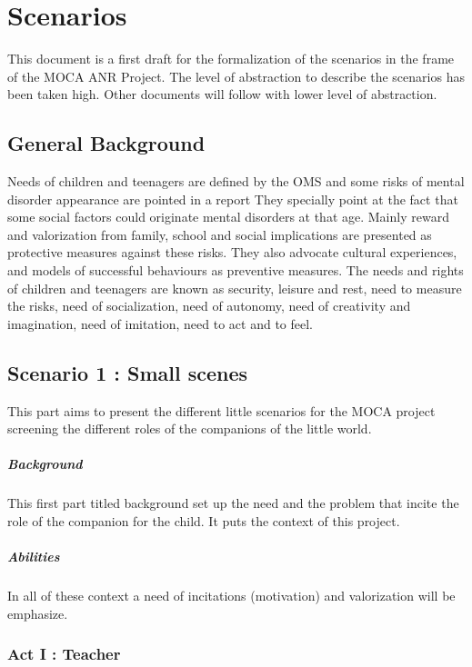 \chapter{Scenarios}

This document is a first draft for the formalization of the scenarios in the frame of the MOCA ANR Project. 
The level of abstraction to describe the scenarios has been taken high. Other documents will follow with lower level of abstraction. 

\section{General Background}
Needs of children and teenagers are defined by the OMS and some risks of mental disorder appearance are pointed in a report %
They specially point at the fact that some social factors could originate mental disorders at that age. Mainly reward and valorization from family, school and social implications are presented as protective measures against these risks. They also advocate cultural experiences, and models of successful behaviours as preventive measures.
The needs and rights of children and teenagers are known as security, leisure and rest, need to measure the risks, need of socialization, need of autonomy, need of creativity and imagination, need of imitation, need to act and to feel.

\section{Scenario 1 : Small scenes}
This part aims to present the different little scenarios for the MOCA project screening the different roles of the companions of the little world. 

\paragraph{Background}
This first part titled background set up the need and the problem that incite the role of the companion for the child.
It puts the context of this project. 
\paragraph{Abilities}
In all of these context a need of incitations (motivation) and valorization will be emphasize. 


\subsection{Act I : Teacher }
